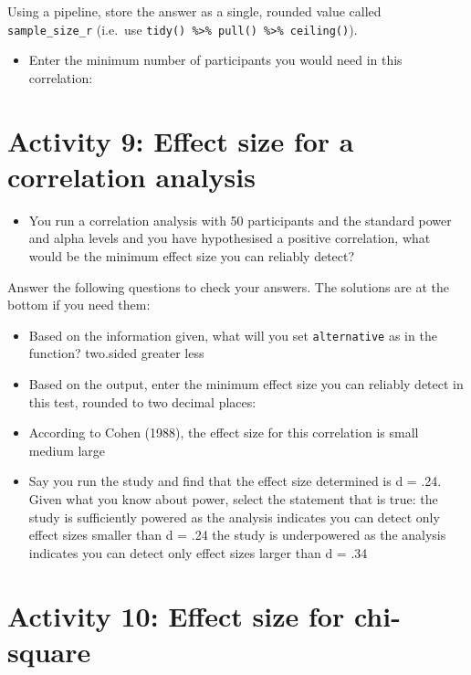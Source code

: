 \documentclass[]{book}
\providecommand{\tightlist}{%
  \setlength{\itemsep}{0pt}\setlength{\parskip}{0pt}}
\begin{document}
Using a pipeline, store the answer as a single, rounded value called \texttt{sample\_size\_r} (i.e.~use \texttt{tidy()\ \%\textgreater{}\%\ pull()\ \%\textgreater{}\%\ ceiling()}).

\begin{itemize}
\tightlist
\item
  Enter the minimum number of participants you would need in this correlation: 
\end{itemize}

\hypertarget{activity-9-effect-size-for-a-correlation-analysis}{%
\section{Activity 9: Effect size for a correlation analysis}\label{activity-9-effect-size-for-a-correlation-analysis}}

\begin{itemize}
\tightlist
\item
  You run a correlation analysis with 50 participants and the standard power and alpha levels and you have hypothesised a positive correlation, what would be the minimum effect size you can reliably detect?
\end{itemize}

Answer the following questions to check your answers. The solutions are at the bottom if you need them:

\begin{itemize}
\tightlist
\item
  Based on the information given, what will you set \texttt{alternative} as in the function? two.sided greater less
\item
  Based on the output, enter the minimum effect size you can reliably detect in this test, rounded to two decimal places: 
\item
  According to Cohen (1988), the effect size for this correlation is small medium large
\item
  Say you run the study and find that the effect size determined is d = .24. Given what you know about power, select the statement that is true: the study is sufficiently powered as the analysis indicates you can detect only effect sizes smaller than d = .24 the study is underpowered as the analysis indicates you can detect only effect sizes larger than d = .34
\end{itemize}

\hypertarget{activity-10-effect-size-for-chi-square}{%
\section{Activity 10: Effect size for chi-square}\label{activity-10-effect-size-for-chi-square}}
\end{document}
